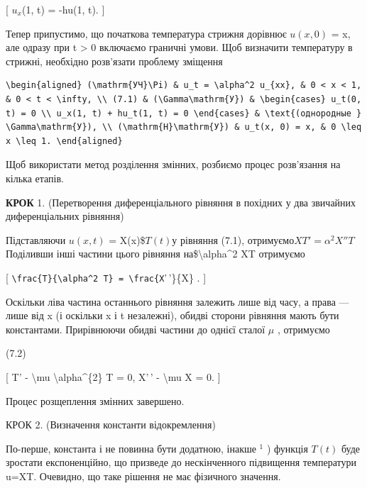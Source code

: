 \documentclass[
]{article}
\begin{document}
{{{[} \(u_x\)(1, t) = -hu(1, t). {]}

Тепер припустимо, що початкова температура стрижня дорівнює \(u(x, 0)\)
= x, але одразу при t \textgreater{} 0 включаємо граничні умови. Щоб
визначити температуру в стрижні, необхідно розв'язати проблему зміщення

\begin{verbatim}
\begin{aligned} (\mathrm{УЧ}\Pi) & u_t = \alpha^2 u_{xx}, & 0 < x < 1, & 0 < t < \infty, \\ (7.1) & (\Gamma\mathrm{У}) & \begin{cases} u_t(0, t) = 0 \\ u_x(1, t) + hu_t(1, t) = 0 \end{cases} & \text{(однородные } \Gamma\mathrm{У}), \\ (\mathrm{H}\mathrm{У}) & u_t(x, 0) = x, & 0 \leq x \leq 1. \end{aligned}
\end{verbatim}

Щоб використати метод розділення змінних, розбиємо процес розв'язання на
кілька етапів.

\textbf{КРОК} 1. (Перетворення диференціального рівняння в похідних у
два звичайних диференціальних рівняння)

Підставляючи \(u(x, t)\) = X(x)\$\(T(t)\)у рівняння (7.1),
отримуємо\(XT' = \alpha^2 X''T\)Поділивши інші частини цього рівняння
на\$\textbackslash alpha\^{}2 XT отримуємо

{[}
\texttt{\textbackslash{}frac\{T\textquotesingle{}\}\{\textbackslash{}alpha\^{}2\ T\}\ =\ \textbackslash{}frac\{X}'\,'\}\{X\}
. {]}

Оскільки ліва частина останнього рівняння залежить лише від часу, а
права --- лише від x (і оскільки x і t незалежні), обидві сторони
рівняння мають бути константами. Прирівнюючи обидві частини до однієї
сталої \(\mu\) , отримуємо

(7.2)

{[} T' - \textbackslash mu \textbackslash alpha\^{}\{2\} T = 0, X'\,' -
\textbackslash mu X = 0. {]}

Процес розщеплення змінних завершено.

КРОК 2. (Визначення константи відокремлення)

По-перше, константа і не повинна бути додатною, інакше \(^{1}\) )
функція \(T\left( t\right)\) буде зростати експоненційно, що призведе до
нескінченного підвищення температури u=XT. Очевидно, що таке рішення не
має фізичного значення.

}}
\end{document}
